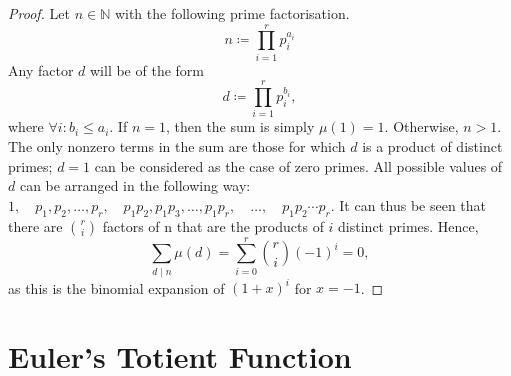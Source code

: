 \documentclass[a4paper]{article}
\theoremstyle{definition}
\begin{document}
\begin{proof}
    Let $n \in \mathbb{N}$ with the following prime factorisation.
    \begin{equation*}
        n \coloneq \prod_{i=1}^r p_i^{a_i}
    \end{equation*}
    Any factor $d$ will be of the form
    \begin{equation*}
        d \coloneq \prod_{i=1}^r p_i^{b_i},
    \end{equation*}
    where $\forall i\colon b_i \leq a_i$.
    If $n = 1$, then the sum is simply $\mu(1) = 1$.
    Otherwise, $n > 1$.
    The only nonzero terms in the sum are those for which $d$ is a product of distinct primes; $d=1$ can be considered as the case of zero primes.
    All possible values of $d$ can be arranged in the following way: $1, \quad p_1, p_2, \dots, p_r, \quad p_1 p_2, p_1 p_3, \dots, p_1 p_r, \allowbreak \quad \dots, \quad p_1 p_2 \cdots p_r$.
    It can thus be seen that there are $\binom{r}{i}$ factors of n that are the products of $i$ distinct primes.
    Hence,
    \begin{equation*}
        \sum_{d \mid n} \mu (d) = \sum_{i=0}^{r} \binom{r}{i} (-1)^i = 0,
    \end{equation*}
    as this is the binomial expansion of $(1 + x)^i$ for $x=-1$.
\end{proof}

\section{Euler's Totient Function}
\end{document}
